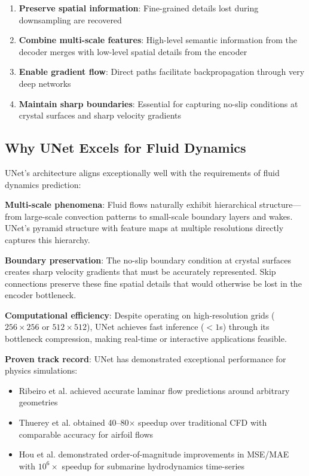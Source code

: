 \begin{enumerate}
    \item \textbf{Preserve spatial information}: Fine-grained details lost during downsampling are recovered
    \item \textbf{Combine multi-scale features}: High-level semantic information from the decoder merges with low-level spatial details from the encoder
    \item \textbf{Enable gradient flow}: Direct paths facilitate backpropagation through very deep networks
    \item \textbf{Maintain sharp boundaries}: Essential for capturing no-slip conditions at crystal surfaces and sharp velocity gradients
\end{enumerate}

\subsection{Why UNet Excels for Fluid Dynamics}

UNet's architecture aligns exceptionally well with the requirements of fluid dynamics prediction:

\textbf{Multi-scale phenomena}: Fluid flows naturally exhibit hierarchical structure---from large-scale convection patterns to small-scale boundary layers and wakes. UNet's pyramid structure with feature maps at multiple resolutions directly captures this hierarchy.

\textbf{Boundary preservation}: The no-slip boundary condition at crystal surfaces creates sharp velocity gradients that must be accurately represented. Skip connections preserve these fine spatial details that would otherwise be lost in the encoder bottleneck.

\textbf{Computational efficiency}: Despite operating on high-resolution grids ($256 \times 256$ or $512 \times 512$), UNet achieves fast inference ($<1$s) through its bottleneck compression, making real-time or interactive applications feasible.

\textbf{Proven track record}: UNet has demonstrated exceptional performance for physics simulations:
\begin{itemize}
    \item Ribeiro et al. \cite{ribeiro2019unet_flow} achieved accurate laminar flow predictions around arbitrary geometries
    \item Thuerey et al. \cite{thuerey2020deep} obtained 40--80$\times$ speedup over traditional CFD with comparable accuracy for airfoil flows
    \item Hou et al. \cite{hou2022unet_lstm} demonstrated order-of-magnitude improvements in MSE/MAE with $10^6\times$ speedup for submarine hydrodynamics time-series
\end{itemize}

